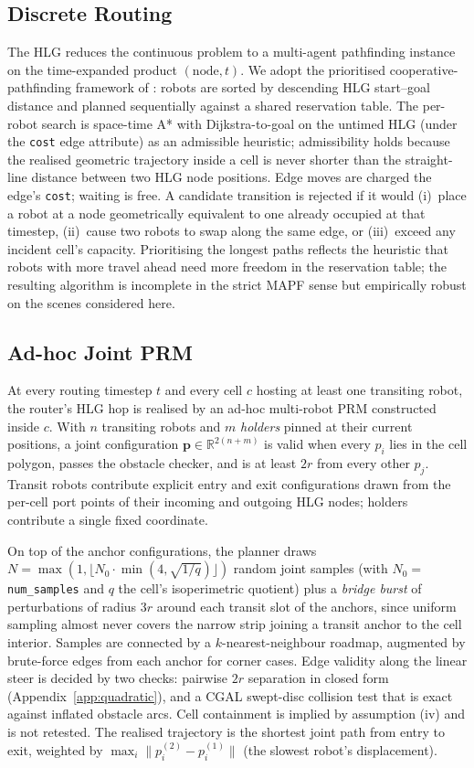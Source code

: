 \documentclass[12pt,a4paper]{article}
\begin{document}
    \subsection{Discrete Routing}
    \label{sec:routing}
    The HLG reduces the continuous problem to a multi-agent pathfinding instance on the time-expanded product $(\text{node},t)$. We adopt the prioritised cooperative-pathfinding framework of \citet{Silver2005}: robots are sorted by descending HLG start--goal distance and planned sequentially against a shared reservation table. The per-robot search is space-time A* with Dijkstra-to-goal on the untimed HLG (under the \texttt{cost} edge attribute) as an admissible heuristic; admissibility holds because the realised geometric trajectory inside a cell is never shorter than the straight-line distance between two HLG node positions. Edge moves are charged the edge's \texttt{cost}; waiting is free. A candidate transition is rejected if it would (i)~place a robot at a node geometrically equivalent to one already occupied at that timestep, (ii)~cause two robots to swap along the same edge, or (iii)~exceed any incident cell's capacity. Prioritising the longest paths reflects the heuristic that robots with more travel ahead need more freedom in the reservation table; the resulting algorithm is incomplete in the strict MAPF sense but empirically robust on the scenes considered here.

    \subsection{Ad-hoc Joint PRM}
    \label{sec:adhoc}
    At every routing timestep $t$ and every cell $c$ hosting at least one transiting robot, the router's HLG hop is realised by an ad-hoc multi-robot PRM constructed inside $c$. With $n$ transiting robots and $m$ \emph{holders} pinned at their current positions, a joint configuration $\mathbf{p}\in\mathbb{R}^{2(n+m)}$ is valid when every $p_i$ lies in the cell polygon, passes the obstacle checker, and is at least $2r$ from every other $p_j$. Transit robots contribute explicit entry and exit configurations drawn from the per-cell port points of their incoming and outgoing HLG nodes; holders contribute a single fixed coordinate.

    On top of the anchor configurations, the planner draws $N=\max(1,\lfloor N_0\cdot\min(4,\sqrt{1/q})\rfloor)$ random joint samples (with $N_0=\,$\texttt{num\_samples} and $q$ the cell's isoperimetric quotient) plus a \emph{bridge burst} of perturbations of radius $3r$ around each transit slot of the anchors, since uniform sampling almost never covers the narrow strip joining a transit anchor to the cell interior. Samples are connected by a $k$-nearest-neighbour roadmap, augmented by brute-force edges from each anchor for corner cases. Edge validity along the linear steer is decided by two checks: pairwise $2r$ separation in closed form (Appendix~\ref{app:quadratic}), and a CGAL swept-disc collision test that is exact against inflated obstacle arcs. Cell containment is implied by assumption (iv) and is not retested. The realised trajectory is the shortest joint path from entry to exit, weighted by $\max_i\|p_i^{(2)}-p_i^{(1)}\|$ (the slowest robot's displacement).
\end{document}
